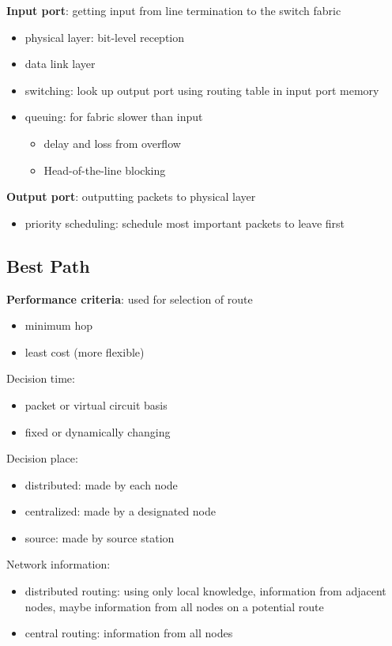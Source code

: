 \documentclass[]{article}
\theoremstyle{definition}
\begin{document}
	\textbf{Input port}: getting input from line termination to the switch fabric
	\begin{itemize}
		\item physical layer: bit-level reception
		\item data link layer
		\item switching: look up output port using routing table in input port memory 	
		\item queuing: for fabric slower than input
			\begin{itemize}
				\item delay and loss from overflow
				\item Head-of-the-line blocking
			\end{itemize}
	\end{itemize}

	\textbf{Output port}: outputting packets to physical layer
	\begin{itemize}
		\item priority scheduling: schedule most important packets to leave first 
	\end{itemize}

	\subsection{Best Path}
	\textbf{Performance criteria}: used for selection of route
	\begin{itemize}
		\item minimum hop
		\item least cost (more flexible)
	\end{itemize}

	Decision time:
	\begin{itemize}
		\item packet or virtual circuit basis
		\item fixed or dynamically changing
	\end{itemize}

	Decision place:
	\begin{itemize}
		\item distributed: made by each node
		\item centralized: made by a designated node
		\item source: made by source station
	\end{itemize}

	Network information:
	\begin{itemize}
		\item distributed routing: using only local knowledge, information from adjacent nodes, maybe information from all nodes on a potential route
		\item central routing: information from all nodes
	\end{itemize}
\end{document}
